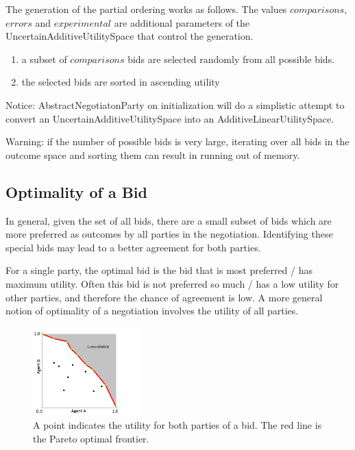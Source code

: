 \documentclass[]{article}
\begin{document}
The generation of the partial ordering works as follows. The values $comparisons$, $errors$ and $experimental$ are additional parameters of the UncertainAdditiveUtilitySpace that control the generation. 
\begin{enumerate}
\item a subset of $comparisons$ bids are selected randomly from all possible bids. 
\item the selected bids are sorted in ascending utility
\end{enumerate}

Notice: AbstractNegotiatonParty on initialization will do a simplistic attempt to convert an UncertainAdditiveUtilitySpace into an AdditiveLinearUtilitySpace. 

Warning: if the number of possible bids is very large, iterating over all bids in the outcome space and sorting them can result in running out of memory.  



\subsection{Optimality of a Bid}
In general, given the set of all bids, there are a small subset of bids which are more preferred as outcomes by all parties in the negotiation. Identifying these special bids may lead to a better agreement for both parties.

For a single party, the optimal bid is the bid that is most preferred / has maximum utility. Often this bid is not preferred so much / has a low utility for other parties, and therefore the chance of agreement is low. A more general notion of optimality of a negotiation involves the utility of all parties.

\begin{figure}[htb]
	\centering
	\includegraphics[width=0.37\textwidth]{media/image5.png}
\caption{A point indicates the utility for both parties of a bid. The red line is the Pareto optimal frontier.}\label{Fig:utility plot}
\end{figure}
\end{document}
